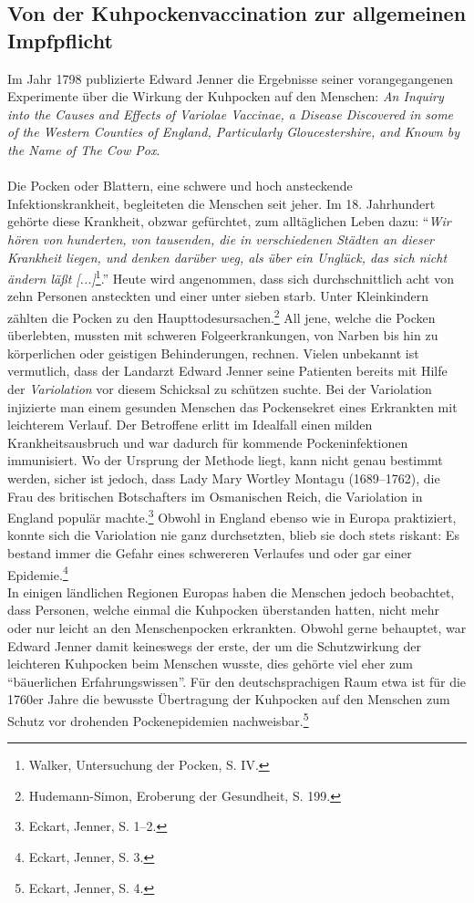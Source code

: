\documentclass[
    a4paper,
    12pt,
    hyphens,
    chapterprefix=true,
    headheight=33pt,
    footheight=29pt,
    headings=optiontohead,
]{scrartcl}
\begin{document}
\subsection{Von der Kuhpockenvaccination zur allgemeinen Impfpflicht}
Im Jahr 1798 publizierte Edward Jenner die Ergebnisse seiner vorangegangenen Experimente über die Wirkung der Kuhpocken auf den Menschen: \textit{An Inquiry into the Causes and Effects of Variolae Vaccinae, a Disease Discovered in some of the Western Counties of England, Particularly Gloucestershire, and Known by the Name of The Cow Pox}.\\
\\
Die Pocken oder Blattern, eine schwere und hoch ansteckende Infektionskrankheit, begleiteten die Menschen seit jeher. Im 18. Jahrhundert gehörte diese Krankheit, obzwar gefürchtet, zum alltäglichen Leben dazu: "`\textit{Wir hören von hunderten, von tausenden, die in verschiedenen Städten an dieser Krankheit liegen, und denken darüber weg, als über ein Unglück, das sich nicht ändern läßt [...]}\footnote{Walker, Untersuchung der Pocken, S. IV.}."'
 Heute wird angenommen, dass sich durchschnittlich acht von zehn Personen ansteckten und einer unter sieben starb. Unter Kleinkindern zählten die Pocken zu den Haupttodesursachen.\footnote{Hudemann-Simon,
Eroberung der Gesundheit, S. 199.} All jene, welche die Pocken überlebten, mussten mit schweren Folgeerkrankungen, von Narben bis hin zu körperlichen oder geistigen Behinderungen, rechnen. Vielen unbekannt ist vermutlich, dass der Landarzt Edward Jenner seine Patienten bereits mit Hilfe der \textit{Variolation} vor diesem Schicksal zu schützen suchte. Bei der Variolation injizierte man einem gesunden Menschen das Pockensekret eines Erkrankten mit leichterem Verlauf. Der Betroffene erlitt im Idealfall einen milden Krankheitsausbruch und war dadurch für kommende Pockeninfektionen immunisiert. Wo der Ursprung der Methode liegt, kann nicht genau bestimmt werden, sicher ist jedoch, dass Lady Mary Wortley Montagu (1689--1762), die Frau des britischen Botschafters im Osmanischen Reich, die Variolation in England populär machte.\footnote{Eckart, Jenner, S. 1--2.} Obwohl in England ebenso wie in Europa praktiziert, konnte sich die Variolation nie ganz durchsetzten, blieb sie doch stets riskant: Es bestand immer die Gefahr eines schwereren Verlaufes und oder gar einer Epidemie.\footnote{Eckart, Jenner, S. 3.}\\
In einigen ländlichen Regionen Europas haben die Menschen jedoch beobachtet, dass Personen, welche einmal die Kuhpocken überstanden hatten, nicht mehr oder nur leicht an den Menschenpocken erkrankten. Obwohl gerne behauptet, war Edward Jenner damit keineswegs der erste, der um die Schutzwirkung der leichteren Kuhpocken beim Menschen wusste, dies gehörte viel eher zum "`bäuerlichen Erfahrungswissen"'. Für den deutschsprachigen Raum etwa ist für die 1760er Jahre die bewusste Übertragung der Kuhpocken auf den Menschen zum Schutz vor drohenden Pockenepidemien nachweisbar.\footnote{Eckart, Jenner, S. 4.}
\end{document}
